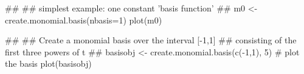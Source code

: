 \begin{Examples}
\begin{ExampleCode}
##
## simplest example: one constant 'basis function'
##
m0 <- create.monomial.basis(nbasis=1)
plot(m0)

##
## Create a monomial basis over the interval [-1,1]
##  consisting of the first three powers of t
##
basisobj <- create.monomial.basis(c(-1,1), 5)
#  plot the basis
plot(basisobj)
\end{ExampleCode}
\end{Examples}

